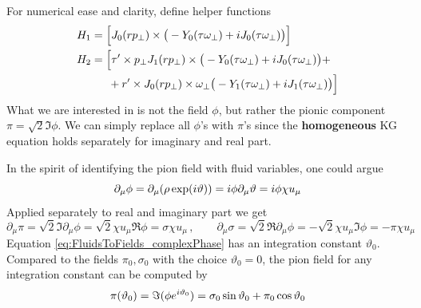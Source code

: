 For numerical ease and clarity, define helper functions
\begin{subequations}
    \begin{align}
        H_1 & =\Big[J_0(r p_\perp)\times\big(-Y_0(\tau\omega_\perp)+{i} J_0(\tau\omega_\perp)\big)\Big]                                       \\
        H_2 & =\Big[\tau^\prime\times p_\perp J_1(r p_\perp)\times\big(-Y_0(\tau\omega_\perp)+{i} J_0(\tau\omega_\perp)\big)+\nonumber        \\
            & \phantom{=\Big[}+r^\prime\times J_0(r p_\perp)\times\omega_\perp\big(-Y_1(\tau\omega_\perp)+{i} J_1(\tau\omega_\perp)\big)\Big]
    \end{align}
\end{subequations}
What we are interested in is not the field $\phi$, but rather the pionic component $\pi=\sqrt{2}\Im\phi$. We can simply replace all $\phi$'s with $\pi$'s since the \textbf{homogeneous} KG equation holds separately for imaginary and real part.

In the spirit of identifying the pion field with fluid variables, one could argue
\begin{equation}
    \partial_\mu\phi=\partial_\mu(\rho\exp({i}\vartheta))={i}\phi\partial_\mu\vartheta={i}\phi\chi u_\mu
\end{equation}
Applied separately to real and imaginary part we get
\begin{equation}
    \partial_\mu\pi=\sqrt{2}\Im\partial_\mu\phi=\sqrt{2}\chi u_\mu\Re\phi=\sigma\chi u_\mu\,,\qquad\partial_\mu\sigma=\sqrt{2}\Re\partial_\mu\phi=-\sqrt{2}\chi u_\mu\Im\phi=-\pi\chi u_\mu
\end{equation}
Equation \eqref{eq:FluidsToFields_complexPhase} has an integration constant $\vartheta_0$. Compared to the fields $\pi_0,\sigma_0$ with the choice $\vartheta_0=0$, the pion field for any integration constant can be computed by
\begin{equation}
    \pi(\vartheta_0)=\Im(\phi e^{{i}\vartheta_0})=\sigma_0\sin\vartheta_0+\pi_0\cos\vartheta_0
\end{equation}

